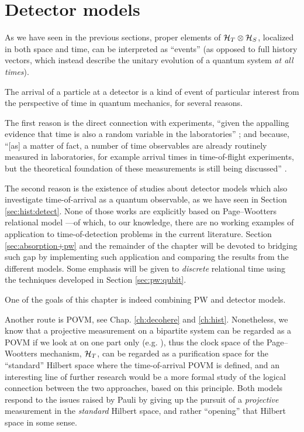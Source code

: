 \section{Detector models}

As we have seen in the previous sections,
proper elements of $\mathcal{H}_T \otimes \mathcal{H}_S$,
localized in both space and time,
can be interpreted as ``events''
(as opposed to full history vectors, which instead describe the unitary evolution
of a quantum system \emph{at all times}).

The arrival of a particle at a detector
is a kind of event
of particular interest from the perspective of time
in quantum mechanics, for several reasons.

The first reason
is the direct connection with experiments,
``given the appalling evidence that time is also a random variable in the laboratories''
\parencite[Ch. 4]{TQM2};
and because,
``{[as]} a matter of fact, a number of time observables are already routinely measured in laboratories,
for example arrival times in time-of-flight experiments,
but the theoretical foundation of these measurements is still being discussed''
\parencite[Preface to the First Ed.]{TQM1}.

The second reason is the existence of studies
about detector models which also investigate
time-of-arrival as a quantum observable,
as we have seen in Section \ref{sec:hist:detect}.
None of those works are explicitly
based on Page--Wootters relational model ---of which, to our knowledge,
there are no working examples of application to
time-of-detection problems in the current literature.
Section \ref{sec:absorption+pw} and the remainder of the chapter
will be devoted to bridging such gap
by implementing such application
and comparing
the results from the different models.
Some emphasis will be given to
\emph{discrete} relational time
using the techniques developed in Section \ref{sec:pw:qubit}.

One of the goals of this chapter
is indeed combining PW and detector models.

Another route is POVM, see Chap. \ref{ch:decohere} and \ref{ch:hist}.
Nonetheless, we know that a projective measurement on a bipartite system
can be regarded as a POVM
if we look at
on one part only (e.g. \cite{Paris2012}),
thus the clock space of the Page--Wootters mechanism, $\mathcal{H}_T$,
can be regarded as a purification space \parencite{Paris2012} for the ``standard''
Hilbert space where the time-of-arrival POVM is defined,
and an interesting line of further research would be a more formal
study of the logical connection between the two approaches, based on this principle.
Both models respond to the issues raised by Pauli
by giving up
the pursuit of
a \emph{projective} measurement in the \emph{standard} Hilbert space,
and rather ``opening'' that Hilbert space in some sense.

